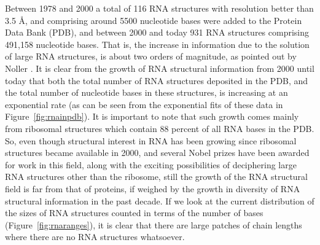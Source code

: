 \noindent Between  1978 and  2000 a total  of 116 RNA  structures with
resolution better than 3.5  \AA, and comprising around 5500 nucleotide
bases were added to the Protein  Data Bank (PDB), and between 2000 and
today  931  RNA  structures comprising  491,158  nucleotide
bases.  That  is, the increase in  information due to  the solution of
large RNA structures, is about two orders of magnitude, as pointed out
by  Noller \cite{noller2005}.   It is  clear  from the  growth of  RNA
structural  information from  2000  until today  that  both the  total
number of RNA structures deposited in the PDB, and the total number of
nucleotide bases in these  structures, is increasing at an exponential
rate  (as can  be seen  from  the exponential  fits of  these data  in
Figure~\ref{fig:rnainpdb}).  It is important  to note that such growth
comes mainly from ribosomal structures which contain 88 percent of all
RNA bases in the PDB.  So,  even though structural interest in RNA has
been growing since ribosomal  structures became available in 2000, and
several Nobel prizes  have been awarded for work  in this field, along
with   the   exciting   possibilities   of   deciphering   large   RNA
\cite{weinberg2009}  structures  other than  the  ribosome, still  the
growth of  the RNA structural field  is far from that  of proteins, if
weighed by  the growth in  diversity of RNA structural  information in
the past decade.  If we look  at the current distribution of the sizes
of  RNA   structures  counted  in   terms  of  the  number   of  bases
(Figure~\ref{fig:rnaranges}), it is clear that there are large patches
of chain lengths where there are no RNA structures whatsoever.

